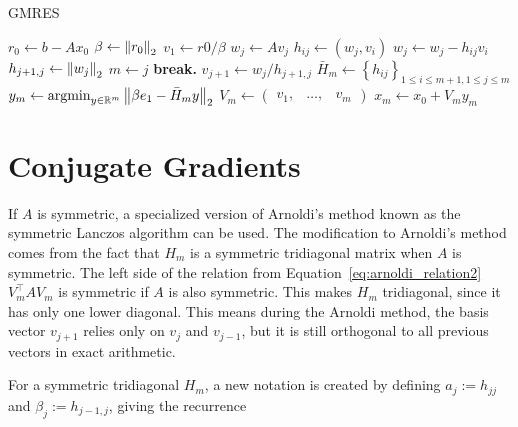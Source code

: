 \begin{algorithm}
	\caption{GMRES}\label{alg:gmres}
	\begin{algorithmic}[1]
            \State $r_0 \gets b-Ax_0$
            \State $\beta \gets \left\lVert r_0\right\rVert_2$
            \State $v_1 \gets r0/\beta$
              \label{alg:gmres_arnoldi}
                \State $w_j \gets A v_j$
                    \State $h_{ij} \gets \left(w_j, v_i\right)$
                    \State $w_j \gets w_j - h_{ij}v_i$
                \EndFor
                \State $h_{j+1, j} \gets \left\lVert w_j\right\rVert_2$
                    \State $m \gets j$
                    \State \textbf{break.}
                \EndIf
                \State $v_{j+1} \gets w_j/h_{j+1, j}$
            \EndFor
            \State $\bar{H}_m \gets \left\{h_{ij}\right\}_{1 \leq i \leq m+1, 1\leq j \leq m}$ 
            \State $y_m  \gets \operatorname*{argmin}_{y \in \mathbb{R}^m} \left\lVert\beta e_1 - \bar{H}_m y\right\rVert_2$ 
            \State $V_m \gets \begin{pmatrix}
                v_1, & \ldots, & v_m
            \end{pmatrix}$ 
            \State $x_m \gets x_0 + V_m y_m$
		\EndProcedure
	\end{algorithmic}
\end{algorithm}

\section{Conjugate Gradients}
If $A$ is symmetric, a specialized version of Arnoldi's method known as the symmetric Lanczos algorithm can be used. The modification to Arnoldi's method comes from the fact that $H_m$ is a symmetric tridiagonal matrix when $A$ is symmetric. The left side of the relation from Equation~\ref{eq:arnoldi_relation2} $V^\top_m A V_m$ is symmetric if $A$ is also symmetric. This makes $H_m$ tridiagonal, since it has only one lower diagonal. This means during the Arnoldi method, the basis vector $v_{j+1}$ relies only on $v_j$ and $v_{j-1}$, but it is still orthogonal to all previous vectors in exact arithmetic.

For a symmetric tridiagonal $H_m$, a new notation is created by defining $a_j := h_{jj}$ and $\beta_j := h_{j-1, j}$, giving the recurrence

